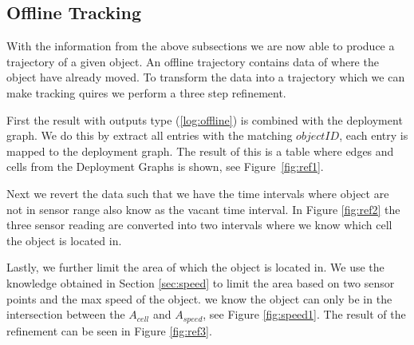 \subsection{Offline Tracking}
\label{sub:offline}
With the information from the above subsections we are now able to produce a trajectory of a given object.
An offline trajectory contains data of where the object have already moved.
To transform the data into a trajectory which we can make tracking quires we perform a three step refinement.

First the result with outputs type (\ref{log:offline}) is combined with the deployment graph.
We do this by extract all entries with the matching $objectID$, each entry is mapped to the deployment graph.
The result of this is a table where edges and cells from the Deployment Graphs is shown, see Figure~\ref{fig:ref1}.  

Next we revert the data such that we have the time intervals where object are not in sensor range also know as the vacant time interval.
In Figure \ref{fig:ref2} the three sensor reading are converted into two intervals where we know which cell the object is located in.

Lastly, we further limit the area of which the object is located in. 
We use the knowledge obtained in Section \ref{sec:speed} to limit the area based on two sensor points and the max speed of the object.
we know the object can only be in the intersection between the $A_{cell}$ and $A_{speed}$, see Figure \ref{fig:speed1}.
The result of the refinement can be seen in Figure \ref{fig:ref3}.
 


